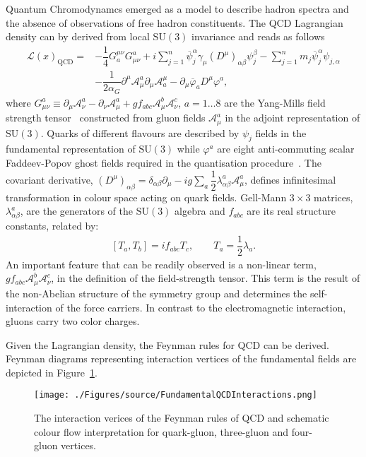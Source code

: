 Quantum Chromodynamcs emerged as a model to describe hadron spectra and the absence of observations of free hadron constituents. The QCD Lagrangian density can by derived from local $\mathrm{SU}\left(3\right)$ invariance and reads as follows
\begin{align}
 \mathcal{L}\left( x\right)_{\mathrm{QCD}}  = & -\dfrac{1}{4}G_a^{\mu\nu}G_{\mu\nu}^a + i\sum_{j=1}^n{\overline{\psi}^{\alpha}_j \gamma_\mu \left( D^\mu \right)_{\alpha\beta} \psi_j^\beta } - \sum_{j=1}^n{m_j\overline{\psi}^{\alpha}_j\psi_{j,\alpha}} \\
					      & - \dfrac{1}{2\alpha_G} \partial^\mu \mathcal{A}^a_\mu \partial_\mu \mathcal{A}_a^\mu - \partial_\mu \overline{\varphi}_a D^\mu \varphi^a,
\end{align}
where $G_{\mu\nu}^a \equiv \partial_\mu \mathcal{A}^a_\nu - \partial_\nu \mathcal{A}^a_\mu + gf_{abc}\mathcal{A}^b_\mu \mathcal{A}^c_\nu $, $a=1 \ldots 8$ are the Yang-Mills field strength tensor~\cite{C.N. Yang and R.L. Mills, Phys. Rev. 96 (1954) 191.} constructed from gluon fields $\mathcal{A}^a_\mu$ in the adjoint representation of $\mathrm{SU}\left(3\right)$. Quarks of different flavours are described by $\psi_j$ fields in the fundamental representation of $\mathrm{SU}\left(3\right)$ while $\varphi^a$ are eight anti-commuting scalar Faddeev-Popov ghost fields required in the quantisation procedure~\cite{L.D. Faddeev and Y.N Popov, Phys. Lett. B 25 (1967) 29;
B. De Wit, Phys. Rev. Lett. 12 (1964) 742.}. The covariant derivative, $\left( D^\mu \right)_{\alpha\beta} = \delta_{\alpha\beta}\partial_\mu - ig\sum_a{\dfrac{1}{2}\lambda^a_{\alpha\beta}\mathcal{A}^a_\mu}$, defines infinitesimal transformation in colour space acting on quark fields. Gell-Mann $3\times 3$ matrices, $\lambda^a_{\alpha\beta}$, are the generators of the $\mathrm{SU}\left(3\right)$ algebra and $f_{abc}$ are its real structure constants, related by:
\begin{align}
 \left[T_a,T_b\right] = if_{abc}T_c,\qquad T_a = \dfrac{1}{2}\lambda_a.
\end{align}
An important feature that can be readily observed is a non-linear term, $gf_{abc}\mathcal{A}^b_\mu \mathcal{A}^c_\nu$, in the definition of the field-strength tensor. This term is the result of the non-Abelian structure of the symmetry group and determines the self-interaction of the force carriers. In contrast to the electromagnetic interaction, gluons carry two color charges. 

Given the Lagrangian density, the Feynman rules for QCD can be derived.  Feynman diagrams representing interaction vertices of the fundamental fields are depicted in Figure~\ref{fig:FundamentalQCDInteractions}.
\begin{figure}[t]
	\centering
		\texttt{[image: ./Figures/source/FundamentalQCDInteractions.png]}
	\caption{The interaction verices of the Feynman rules of QCD and schematic colour flow interpretation for quark-gluon, three-gluon and four-gluon vertices.}
	\label{fig:FundamentalQCDInteractions}
\end{figure}

